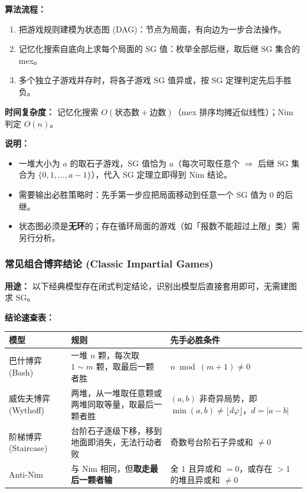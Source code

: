 \textbf{算法流程：}
\begin{enumerate}
    \item 把游戏规则建模为状态图 (DAG)：节点为局面，有向边为一步合法操作。
    \item 记忆化搜索自底向上求每个局面的 SG 值：枚举全部后继，取后继 SG 集合的 mex。
    \item 多个独立子游戏并存时，将各子游戏 SG 值异或，按 SG 定理判定先后手胜负。
\end{enumerate}

\textbf{时间复杂度：} 记忆化搜索 $O(\text{状态数}+\text{边数})$（mex 排序均摊近似线性）；Nim 判定 $O(n)$。



\textbf{说明：}
\begin{itemize}
    \item 一堆大小为 $a$ 的取石子游戏，SG 值恰为 $a$（每次可取任意个 $\Rightarrow$ 后继 SG 集合为 $\{0,1,\dots,a-1\}$），代入 SG 定理立即得到 Nim 结论。
    \item 需要输出必胜策略时：先手第一步应把局面移动到任意一个 SG 值为 $0$ 的后继。
    \item 状态图必须是\textbf{无环}的；存在循环局面的游戏（如「报数不能超过上限」类）需另行分析。
\end{itemize}

\subsubsection{常见组合博弈结论 (Classic Impartial Games)}

\textbf{用途：}  
以下经典模型存在闭式判定结论，识别出模型后直接套用即可，无需建图求 SG。

\textbf{结论速查表：}

\begin{center}
\begin{tabularx}{\textwidth}{|l|X|X|}
\hline
\textbf{模型} & \textbf{规则} & \textbf{先手必胜条件} \\ \hline
巴什博弈 (Bash) & 一堆 $n$ 颗，每次取 $1\sim m$ 颗，取最后一颗者胜 & $n \bmod (m+1) \ne 0$ \\ \hline
威佐夫博弈 (Wythoff) & 两堆，从一堆取任意颗或两堆同取等量，取最后一颗者胜 & $(a,b)$ 非奇异局势，即 $\min(a,b) \ne \lfloor d\varphi \rfloor$，$d=|a-b|$ \\ \hline
阶梯博弈 (Staircase) & 台阶石子逐级下移，移到地面即消失，无法行动者败 & 奇数号台阶石子异或和 $\ne 0$ \\ \hline
Anti-Nim & 与 Nim 相同，但\textbf{取走最后一颗者输} & 全 $1$ 且异或和 $=0$，或存在 $>1$ 的堆且异或和 $\ne 0$ \\ \hline
\end{tabularx}
\end{center}

